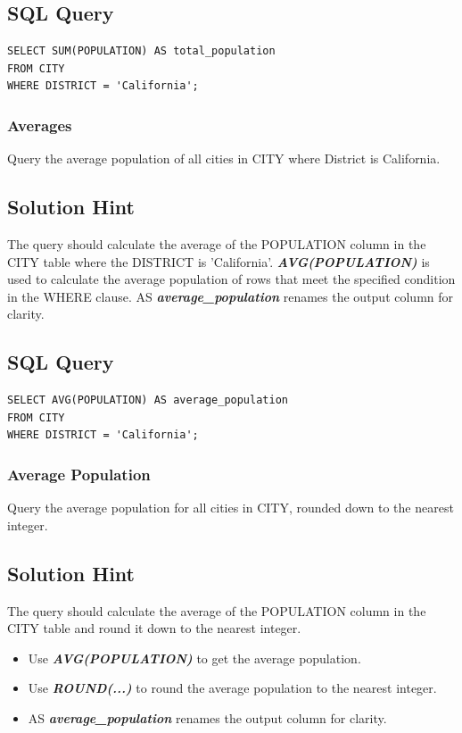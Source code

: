 \documentclass[12pt,a4paper]{article}
\begin{document}
\subsection*{SQL Query}
\begin{lstlisting}[style=sqlstyle]
SELECT SUM(POPULATION) AS total_population
FROM CITY
WHERE DISTRICT = 'California';
\end{lstlisting}
\subsubsection{Averages}
Query the average population of all cities in CITY where District is California.
\subsection*{Solution Hint}
The query should calculate the average of the POPULATION column in the CITY table where the DISTRICT is 'California'.
\newline
\textit{\textbf{AVG(POPULATION)}} is used to calculate the average population of rows that meet the specified condition in the WHERE clause.
AS \textit{\textbf{average\_population}} renames the output column for
clarity.
\subsection*{SQL Query}
\begin{lstlisting}[style=sqlstyle]
SELECT AVG(POPULATION) AS average_population
FROM CITY
WHERE DISTRICT = 'California';
\end{lstlisting}
\subsubsection{Average Population}
Query the average population for all cities in CITY, rounded down to the nearest integer.
\subsection*{Solution Hint}
The query should calculate the average of the POPULATION column in the CITY table and round it down to the nearest integer.
\begin{itemize}
    \item Use \textit{\textbf{AVG(POPULATION)}} to get the average population.
    \item Use \textit{\textbf{ROUND(...)}} to round the average population to the nearest integer.
    \item AS \textit{\textbf{average\_population}} renames the output column for clarity.
\end{itemize}
\end{document}
